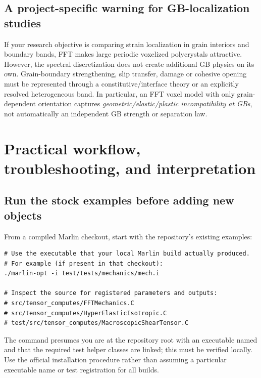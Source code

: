 \documentclass[11pt,a4paper]{article}
\newcommand{\code}[1]{\texttt{\detokenize{#1}}}
\begin{document}
\subsection{A project-specific warning for GB-localization studies}
If your research objective is comparing strain localization in grain interiors and boundary bands, FFT makes large periodic voxelized polycrystals attractive. However, the spectral discretization does not create additional GB physics on its own. Grain-boundary strengthening, slip transfer, damage or cohesive opening must be represented through a constitutive/interface theory or an explicitly resolved heterogeneous band. In particular, an FFT voxel model with only grain-dependent orientation captures \emph{geometric/elastic/plastic incompatibility at GBs}, not automatically an independent GB strength or separation law.

\section{Practical workflow, troubleshooting, and interpretation}
\subsection{Run the stock examples before adding new objects}
From a compiled Marlin checkout, start with the repository's existing examples:
\begin{lstlisting}[style=shell]
# Use the executable that your local Marlin build actually produced.
# For example (if present in that checkout):
./marlin-opt -i test/tests/mechanics/mech.i

# Inspect the source for registered parameters and outputs:
# src/tensor_computes/FFTMechanics.C
# src/tensor_computes/HyperElasticIsotropic.C
# test/src/tensor_computes/MacroscopicShearTensor.C
\end{lstlisting}
The command presumes you are at the repository root with an executable named \code{marlin-opt} and that the required test helper classes are linked; this must be verified locally. Use the official installation procedure rather than assuming a particular executable name or test registration for all builds.
\end{document}

